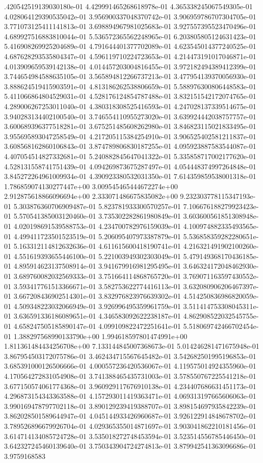.420542519139030180e-01	4.429991465268618978e-01	4.365338245067549305e-01	4.028064129390535042e-01	3.956900337048370742e-01	3.906959786707304705e-01	3.771073125411141813e-01	3.698894967981025683e-01	3.927557395523470496e-01	4.689927516883810044e-01	5.536572365562248965e-01	6.203805805124631423e-01	5.416908269925204689e-01	4.791644401377702089e-01	4.623545014377240525e-01	4.687628293535804347e-01	4.596119710224723653e-01	4.214473191017046871e-01	4.013909659539142138e-01	4.014457203004816455e-01	3.972182494389412399e-01	3.744654984588635105e-01	3.565894812266737213e-01	3.477954139370056930e-01	3.888624519415903591e-01	4.813186262538806659e-01	5.588976300806448583e-01	5.411066864804529031e-01	4.528176124854787488e-01	3.832151542172074765e-01	4.289006267253011040e-01	4.380318308525416593e-01	4.247028137339514675e-01	3.940283134402100540e-01	3.746554110955273020e-01	3.639924442038757757e-01	3.600689396377518281e-01	3.675251485608262980e-01	3.846823115021833495e-01	3.955695893047258549e-01	4.217205115384254910e-01	3.906525402581211837e-01	3.608568162860106843e-01	3.874789806830187255e-01	4.095923887583544087e-01	4.407054514827332681e-01	5.240882845647041322e-01	5.335858717002177620e-01	4.528131558741751439e-01	4.094269873675287497e-01	4.054448374997264848e-01	3.845272264961009934e-01	4.390923380532031350e-01	7.614359859538001318e-01	1.786859074130277447e+00	3.009545465444672274e+00	2.912875618866096694e+00	2.333071486675835082e+00	9.232303778115347193e-01	5.303876360706909487e-01	5.823781933300570257e-01	7.106676188279923423e-01	5.570541385003120460e-01	3.735302282861980849e-01	3.603600561851308948e-01	4.020198691539588753e-01	4.234700782976159039e-01	4.100974882335493565e-01	4.499411723501523519e-01	5.206095407973387879e-01	5.536858359282280651e-01	5.163312114812632636e-01	4.611615600418190741e-01	4.216321491902100260e-01	4.551619393655446100e-01	5.221003949302303049e-01	5.479149368170436185e-01	4.895914623137508914e-01	3.941679916981295495e-01	3.646324172048462930e-01	3.689760082032569333e-01	3.751664114868765720e-01	3.769071163597430552e-01	3.593417761513366671e-01	3.582753622774416113e-01	3.632080906206467397e-01	3.667208436902514301e-01	3.832976823976639302e-01	4.514250836986820059e-01	4.509348223032066949e-01	3.926996495359961759e-01	3.511414753308045311e-01	3.636591336186089651e-01	4.346583092622238187e-01	4.862908522032545755e-01	4.658247505185890147e-01	4.099109822472251641e-01	5.518069742466702454e-01	1.388297568990133790e+00	1.994618597801474991e+00	1.811361484434256708e+00	7.133144845007368673e-01	5.014246281471675948e-01	3.867954503172075786e-01	3.462434715567645482e-01	3.542682501995196853e-01	3.685391000126506666e-01	4.000557236420536067e-01	4.119575014924355960e-01	4.170564272831054908e-01	3.741388465435731003e-01	3.578550767225541218e-01	3.677150574061774368e-01	3.960929117676910138e-01	4.234407686631451173e-01	4.296873154343363588e-01	4.157293011419363471e-01	4.069313197665606063e-01	3.990169478797702118e-01	3.890129239419388707e-01	3.898154697935842239e-01	3.862028501589644947e-01	4.045144933426960687e-01	3.926122914848678702e-01	3.789526896679926704e-01	4.029365355014871697e-01	3.903041862210181456e-01	3.614714134085724728e-01	3.535018272748453594e-01	3.523514556785446450e-01	3.642327245460139640e-01	3.750343904724274813e-01	3.879942541363096686e-01	3.9759168583